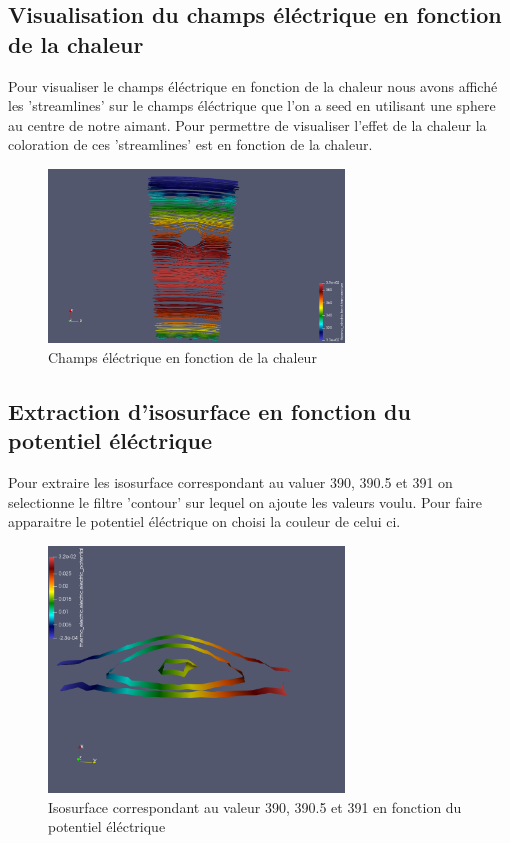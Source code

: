 \documentclass{article}
\begin{document}
\subsection{Visualisation du champs éléctrique en fonction de la chaleur}
Pour visualiser le champs éléctrique en fonction de la chaleur 
nous avons affiché les 'streamlines' sur le champs éléctrique que l'on a seed en utilisant une sphere au centre de notre aimant. 
Pour permettre de visualiser l'effet de la chaleur la coloration de ces 'streamlines' est en fonction de la chaleur.
\begin{figure}[h]
    \centering
    \includegraphics[width=0.7\textwidth]{images/champ_electrique.png}
    \caption{Champs éléctrique en fonction de la chaleur}
\end{figure}
\subsection{Extraction d'isosurface en fonction du potentiel éléctrique}
Pour extraire les isosurface correspondant au valuer 390, 390.5 et 391 on selectionne le filtre 'contour' sur lequel on ajoute les valeurs voulu.
Pour faire apparaitre le potentiel éléctrique on choisi la couleur de celui ci. 
\begin{figure}[h]
    \centering
    \includegraphics[width=0.7\textwidth]{images/isosurface.png}
    \caption{Isosurface correspondant au valeur 390, 390.5 et 391 en fonction du potentiel éléctrique}
\end{figure}
\end{document}
